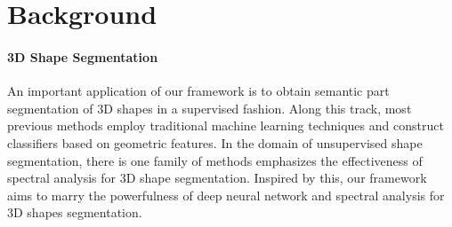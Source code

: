 \documentclass[10pt,twocolumn,letterpaper]{article}
\newcommand{\cmt}[2]{[#1: #2]}
\newcommand{\todo}[1]{\cmt{{\bf TODO}}{{\bf \color{blue} #1}}}
\newcommand{\myparaly}{\vspace*{-5pt}\paragraph}
\begin{document}
\iffalse
\todo{
  some dumps of thoughts:
  \begin{itemize}
  \item{A good 3D representation should be flexible to encode both intrinsic and extrinsic property of the underlying 3D shape. Voxel, multiview images treat non-euclidean domain as euclidean domains and might lose details about the object and break the topological structure. Mesh representation, which not only considers vertex positions of a 3D shape but also encodes connectivity relationship among vertices, serves this purpose well.}
  \item{Existing deep learning framework which consumes mesh representation mostly focuses on near isometric shapes and designs localized convolutional kernels to aggregate information. The key issue here is each mesh being an independent non-euclidean domain makes it hard to share parameters and generalize.} \item{We propose a way to learn to align different non-euclidean domains } \end{itemize}
}
\fi
 
\section{Background}
\label{sec:related}
\myparaly{3D Shape Segmentation}
An important application of our framework is to obtain semantic part segmentation of 3D shapes in a supervised fashion. Along this track, most previous methods \cite{kalogerakis2010learning,xie20143d,makadia2014learning,guo20153d} employ traditional machine learning techniques and construct classifiers based on geometric features.
In the domain of unsupervised shape segmentation, there is one family of methods \cite{liu2004segmentation,liu2007mesh} emphasizes the effectiveness of spectral analysis for 3D shape segmentation. Inspired by this, our framework aims to marry the powerfulness of deep neural network and spectral analysis for 3D shapes segmentation.
\iffalse
\todo{
  \begin{itemize}
    \item brief review existing works on 3d shape segmentation
    \item emphasize the family of spectral methods based shape segmentation papers. make it clear that the intrinsic property is extremely important for 3d shape segmenentation, in contrast to 2d segmentation. 
  \end{itemize}
}
\fi
\end{document}

